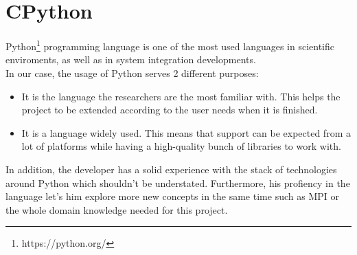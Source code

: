 \section{CPython}

Python\footnote{https://python.org/} programming language is one of the most used
languages in scientific enviroments, as well as in system integration developments.\\

In our case, the usage of Python serves 2 different purposes:
\begin{itemize}
  \item It is the language the researchers are the most familiar with. This
  helps the project to be extended according to the user needs when it is finished.
  \item It is a language widely used. This means that support can be expected 
  from a lot of platforms while having a high-quality bunch of libraries to work
  with.
\end{itemize}


In addition, the developer has a solid experience with the stack of
technologies around Python which shouldn't be understated. Furthermore, his
profiency in the language let's him explore more new concepts in the same time
such as MPI or the whole domain knowledge needed for this project.\\
